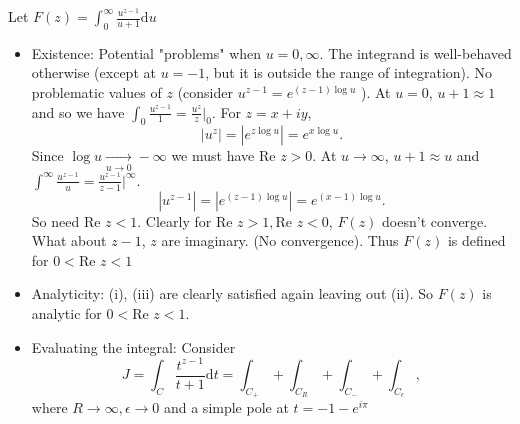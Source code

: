 \documentclass[a4paper]{article}
\begin{document}
\begin{eg}
    Let $F(z) = \int_0^{\infty} \frac{u^{ z - 1}}{u + 1} \text{d}u$ 
    \begin{itemize}
        \item Existence: Potential "problems" when $u = 0 , \infty$. The integrand is well-behaved otherwise (except at $u = -1$, but it is outside the range of integration). No problematic values of $z$ (consider $u^{ z - 1} = e^{ (z - 1) \log u}$ ). At $u = 0$, $u + 1 \approx 1$ and so we have  $\int_0 \frac{u^{z -1}}{1} = \frac{u^{z}}{z} \Bigr|_0$. For $z = x +  i y$,
            \[
                |u^{z} | = |e^{ z \log u}| = e^{x \log u}   
            .\] 
Since $\log u \underset{u \to 0}{\to} -\infty$ we must have $\text{Re }z > 0$. At $u \to \infty$, $u +1 \approx u$ and $\int ^{\infty} \frac{u^{z -1}}{u} = \frac{u^{ z -1}}{z - 1}\Bigr|^{ \infty}$. 
            \[
    |u^{ z -1}| = | e^{ (z - 1) \log u}| = e^{ (x - 1) \log u}    
.\] 
So need $\text{Re } z < 1$. Clearly for $\text{Re } z > 1, \text{Re } z < 0$, $F(z) $ doesn't converge. What about $z - 1$, $z$ are imaginary. (No convergence). Thus $F(z)$ is defined for $0 < \text{Re } z < 1$
        \item Analyticity: (i), (iii) are clearly satisfied again leaving out (ii). So $F(z)$ is analytic for $0 < \text{Re }z < 1$.
        \item Evaluating the integral: Consider $ $
            \[
            J = \int_C \frac{t ^{z - 1}}{ t + 1}\text{d}t  = \int_{C_+} + \int_{C_R} + \int_{C_-} + \int_{C_{\epsilon}}           
        ,\]
        where $R \to \infty, \epsilon \to 0$ and a simple pole at $t = - 1 - e^{ i \pi}$
            \begin{center}
\end{center}
\end{itemize}
\end{eg}
\end{document}
